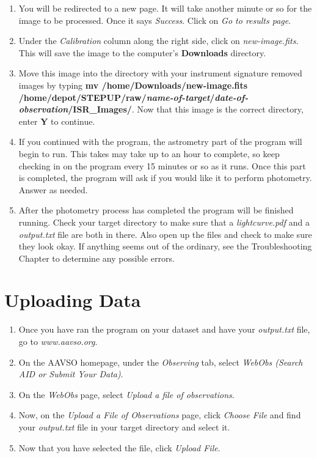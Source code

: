 \documentclass[11pt]{report}
\begin{document}
\begin{enumerate}
\item You will be redirected to a new page. It will take another minute or so for the image to be processed. Once it says \emph{Success}. Click on \emph{Go to results page}.
\item Under the \emph{Calibration} column along the right side, click on \emph{new-image.fits}. This will save the image to the computer's {\bf Downloads} directory.
\item Move this image into the directory with your instrument signature removed images by typing {\bf mv /home/Downloads/new-image.fits /home/depot/STEPUP/raw/\emph{name-of-target}/\emph{date-of-observation}/ISR\_Images/}. Now that this image is the correct directory, enter {\bf Y} to continue.
\item If you continued with the program, the astrometry part of the program will begin to run. This takes may take up to an hour to complete, so keep checking in on the program every 15 minutes or so as it runs. Once this part is completed, the program will ask if you would like it to perform photometry. Answer as needed.
\item After the photometry process has completed the program will be finished running. Check your target directory to make sure that a \emph{lightcurve.pdf} and a \emph{output.txt} file are both in there. Also open up the files and check to make sure they look okay. If anything seems out of the ordinary, see the Troubleshooting Chapter to determine any possible errors.
\end{enumerate}

\chapter{Uploading Data}
\begin{enumerate}
\item Once you have ran the program on your dataset and have your \emph{output.txt} file, go to \emph{www.aavso.org}.
\item On the AAVSO homepage, under the \emph{Observing} tab, select \emph{WebObs (Search AID or Submit Your Data)}.
\item On the \emph{WebObs} page, select \emph{Upload a file of observations}.
\item Now, on the \emph{Upload a File of Observations} page, click \emph{Choose File} and find your \emph{output.txt} file in your target directory and select it.
\item Now that you have selected the file, click \emph{Upload File}.
\end{enumerate}
\end{document}
